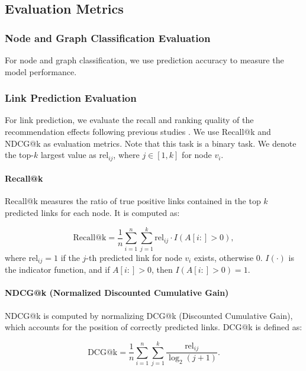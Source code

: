 \subsection{Evaluation Metrics}

\subsubsection{Node and Graph Classification Evaluation}
For node and graph classification, we use prediction accuracy to measure the model performance.

\subsubsection{Link Prediction Evaluation}
For link prediction, we evaluate the recall and ranking quality of the recommendation effects following previous studies \cite{link,link2}. We use Recall@k and NDCG@k as evaluation metrics. Note that this task is a binary task. We denote the top-\(k\) largest value as \( \text{rel}_{ij} \), where \( j \in [1,k] \) for node \( v_i \).

\paragraph{Recall@k}
Recall@k measures the ratio of true positive links contained in the top \(k\) predicted links for each node. It is computed as:

\begin{equation}
\text{Recall@k} = \frac{1}{n} \sum_{i=1}^{n} \sum_{j=1}^{k} \text{rel}_{ij} \cdot I(A[i:] > 0),
\end{equation}
where \( \text{rel}_{ij} = 1 \) if the \( j \)-th predicted link for node \( v_i \) exists, otherwise 0. \( I(\cdot) \) is the indicator function, and if \( A[i:] > 0 \), then \( I(A[i:] > 0) = 1 \).

\paragraph{NDCG@k (Normalized Discounted Cumulative Gain)}
NDCG@k is computed by normalizing DCG@k (Discounted Cumulative Gain), which accounts for the position of correctly predicted links. DCG@k is defined as:

\begin{equation}
\text{DCG@k} = \frac{1}{n} \sum_{i=1}^{n} \sum_{j=1}^{k} \frac{\text{rel}_{ij}}{\log_2(j+1)}.
\end{equation}


